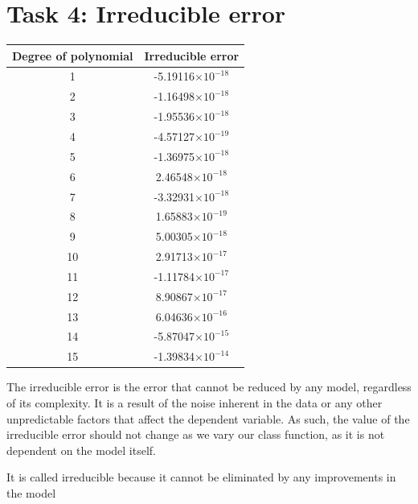 \documentclass{article}
\begin{document}
\section{Task 4: Irreducible error}
\begin{center}

    \begin{tabular}{|c|c|}
        \hline
        Degree of polynomial & Irreducible error  \\
        \hline
        1         & -5.19116$\times 10^{-18}$   \\
        2         & -1.16498$\times 10^{-18}$   \\
        3         & -1.95536$\times 10^{-18}$   \\
        4         & -4.57127$\times 10^{-19}$   \\
        5         & -1.36975$\times 10^{-18}$   \\
        6         &  2.46548$\times 10^{-18}$   \\
        7         & -3.32931$\times 10^{-18}$   \\
        8         &  1.65883$\times 10^{-19}$   \\
        9         &  5.00305$\times 10^{-18}$   \\
       10         &  2.91713$\times 10^{-17}$   \\
       11         & -1.11784$\times 10^{-17}$   \\
       12         &  8.90867$\times 10^{-17}$   \\
       13         &  6.04636$\times 10^{-16}$   \\
       14         & -5.87047$\times 10^{-15}$   \\
       15         & -1.39834$\times 10^{-14}$   \\
 
        \hline
    \end{tabular}

\end{center}

The irreducible error is the error that cannot be reduced by any model, regardless of its complexity. It is a result of the noise inherent in the data or any other unpredictable factors that affect the dependent variable. As such, the value of the irreducible error should not change as we vary our class function, as it is not dependent on the model itself.

It is called irreducible because it cannot be eliminated by any improvements in the model
\end{document}
